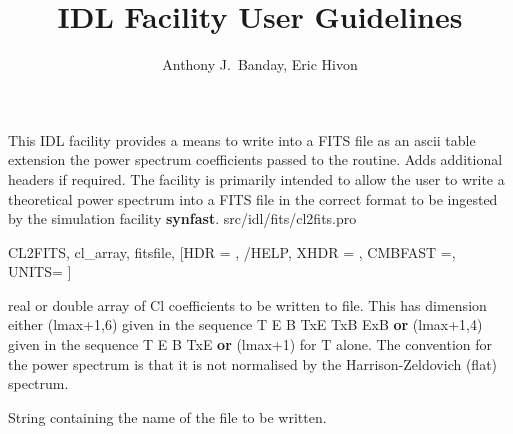 



\sloppy



\title{\healpix IDL Facility User Guidelines}
 \section[cl2fits]{ }
\label{idl:cl2fits}
\author{Anthony J.~Banday, Eric Hivon}




\begin{facility}
{This IDL facility provides a means to
write into a FITS file as an ascii table extension the power 
spectrum coefficients passed to the routine. Adds additional
headers if required. The facility is primarily intended to allow the
user to write a theoretical power spectrum into a FITS file in 
the correct format to be ingested by the \healpix simulation facility 
\textbf{synfast}.
}
{src/idl/fits/cl2fits.pro}
\end{facility}

\begin{IDLformat}
{CL2FITS, cl\_array, fitsfile, [HDR = , /HELP, XHDR = , CMBFAST =, UNITS= ]}
\end{IDLformat}

\begin{qualifiers}
  \begin{qulist}{} %
    \item[cl\_array] real or double array of Cl coefficients to be written to
      file. This has dimension either (lmax+1,6) given in the sequence T E B
      TxE TxB ExB {\bf or} (lmax+1,4) given in the sequence T E B
      TxE {\bf or} (lmax+1) for T alone. The convention for the power spectrum is that it is not
      normalised by the Harrison-Zeldovich (flat) spectrum.
    \item[fitsfile] String containing the name of the file to be written.
  \end{qulist}
\end{qualifiers}


